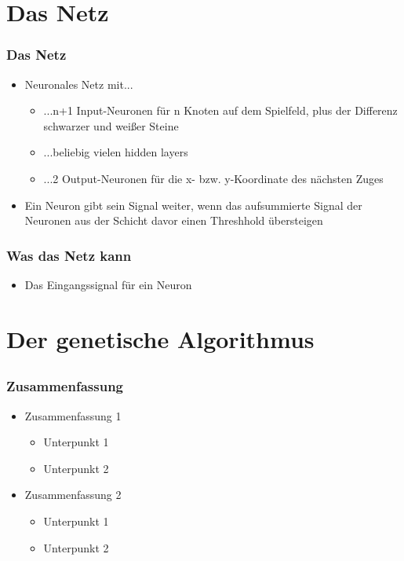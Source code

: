 \documentclass[compress]{beamer}
\begin{document}
\section{Das Netz}

\begin{frame}[fragile]
	\frametitle{Das Netz}

	\begin{itemize}
		\item Neuronales Netz mit...

		\begin{itemize}
			\item ...n+1 Input-Neuronen für n Knoten auf dem Spielfeld, plus der Differenz schwarzer und weißer Steine
			\item ...beliebig vielen hidden layers
			\item ...2 Output-Neuronen für die x- bzw. y-Koordinate des nächsten Zuges
		\end{itemize}

		\item Ein Neuron gibt sein Signal weiter, wenn das aufsummierte Signal der Neuronen aus der Schicht davor einen Threshhold übersteigen
	\end{itemize}
\end{frame}

\begin{frame}
	\frametitle{Was das Netz kann}
	
	\begin{itemize}
		\item Das Eingangssignal für ein Neuron 	
	\end{itemize}
	
\end{frame}

\section{Der genetische Algorithmus}
\subsection*{}

\begin{frame}
	\frametitle{Zusammenfassung}

	\begin{itemize}
		\item Zusammenfassung 1

		\begin{itemize}
			\item Unterpunkt 1
			\item Unterpunkt 2
		\end{itemize}

		\item Zusammenfassung 2

		\begin{itemize}
			\item Unterpunkt 1
			\item Unterpunkt 2
		\end{itemize}
	\end{itemize}
\end{frame}
\end{document}
